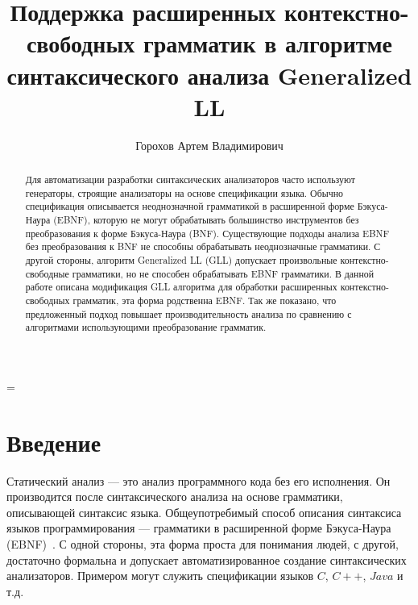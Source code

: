 \newtheorem{mydef}{Определение}
\emergencystretch=\maxdimen



\title{Поддержка расширенных контекстно-свободных грамматик 
	в алгоритме синтаксического анализа Generalized LL}


\author{Горохов Артем Владимирович}



\maketitle

\begin{abstract}
	Для автоматизации разработки синтаксических анализаторов часто используют генераторы, строящие анализаторы на основе спецификации языка.
	Обычно спецификация описывается неоднозначной грамматикой в расширенной форме Бэкуса-Наура (EBNF), которую не могут обрабатывать большинство инструментов без преобразования
	к форме Бэкуса-Наура (BNF).	Существующие подходы анализа EBNF без преобразования к BNF не способны обрабатывать неоднозначные грамматики. С другой стороны, алгоритм Generalized LL (GLL) допускает произвольные контекстно-свободные грамматики, но не способен обрабатывать EBNF грамматики. 
	В данной работе описана модификация GLL алгоритма для обработки расширенных контекстно-свободных грамматик,
	эта форма родственна EBNF. Так же показано, что предложенный подход повышает производительность анализа по сравнению с алгоритмами использующими преобразование грамматик.
\end{abstract}

\section*{Введение}

Статический анализ --- это анализ программного кода без его исполнения. Он производится после синтаксического анализа на основе грамматики,
описывающей синтаксис языка.
Общеупотребимый способ описания синтаксиса языков программирования --- грамматики в расширенной форме Бэкуса-Наура (EBNF)~\cite{EBNFISO}.
С одной стороны, эта форма проста для понимания людей, с другой, достаточно формальна и допускает автоматизированное создание синтаксических анализаторов.
Примером могут служить спецификации языков $C$, $C++$, $Java$ и т.д. 

